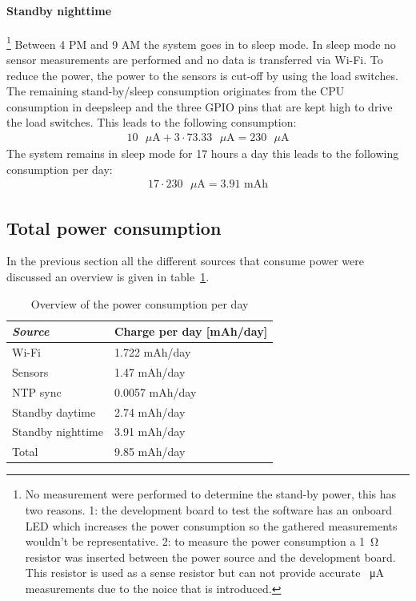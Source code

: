 \documentclass[11pt,a4paper]{article}
\begin{document}
\paragraph{Standby nighttime}\footnote{No measurement were performed to determine the stand-by power, this has two reasons. 1: the development board to test the software has an onboard LED which increases the power consumption so the gathered measurements wouldn't be representative. 2: to measure the power consumption a \SI{1}{\ohm} resistor was inserted between the power source and the development board. This resistor is used as a sense resistor but can not provide accurate \SI{}{\micro\ampere} measurements due to the noice that is introduced. }
Between 4 PM and 9 AM the system goes in to sleep mode. In sleep mode no sensor measurements are performed and no data is transferred via Wi-Fi. To reduce the power, the power to the sensors is cut-off by using the load switches. The remaining stand-by/sleep consumption originates from the CPU consumption in deepsleep and the three GPIO pins that are kept high to drive the load switches. This leads to the following consumption:
\begin{gather*}
	10 \text{ }\mu\text{A} + 3\cdot 73.33\text{ }\mu\text{A} = 230\text{ }\mu\text{A}
\end{gather*}
The system remains in sleep mode for 17 hours a day this leads to the following consumption per day:
\begin{gather*}
	17 \cdot 230\text{ }\mu\text{A}= 3.91\text{ mAh}
\end{gather*}

\subsection{Total power consumption}
In the previous section all the different sources that consume power were discussed an overview is given in table~\ref{tab:pwr}.

\begin{table}[H]
	\centering
	\begin{tabular}{|l|l|}
	\hline
	\textit{\textbf{Source}} & \textbf{Charge per day {[}mAh/day{]}} \\ \hline
	Wi-Fi                    & 1.722 mAh/day                         \\ \hline
	Sensors                  & 1.47 mAh/day                          \\ \hline
	NTP sync                 & 0.0057 mAh/day                        \\ \hline
	Standby daytime          & 2.74 mAh/day                          \\ \hline
	Standby nighttime        & 3.91 mAh/day                          \\ \hline
	\rowcolor{Gray}
	Total                    & 9.85 mAh/day  						 \\ \hline
	\end{tabular}
	\captionsetup{justification=centering}
	\caption{Overview of the power consumption per day}
	\label{tab:pwr}
\end{table}
\end{document}

